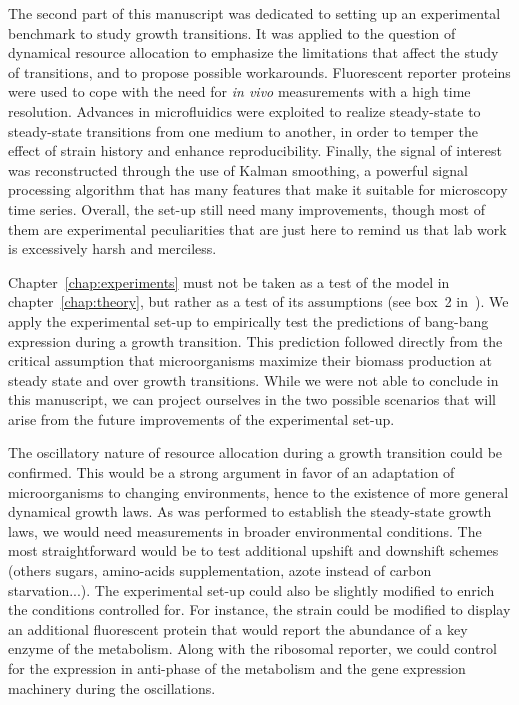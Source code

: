 The second part of this manuscript was dedicated to setting up an experimental benchmark to study growth transitions.
It was applied to the question of dynamical resource allocation to emphasize the limitations that affect the study of transitions, and to propose possible workarounds.
Fluorescent reporter proteins were used to cope with the need for \textit{in vivo} measurements with a high time resolution.
Advances in microfluidics were exploited to realize steady-state to steady-state transitions from one medium to another, in order to temper the effect of strain history and enhance reproducibility.
Finally, the signal of interest was reconstructed through the use of Kalman smoothing, a powerful signal processing algorithm that has many features that make it suitable for microscopy time series.
Overall, the set-up still need many improvements, though most of them are experimental peculiarities that are just here to remind us that lab work is excessively harsh and merciless.

Chapter~\ref{chap:experiments} must not be taken as a test of the model in chapter~\ref{chap:theory}, but rather as a test of its assumptions (see box~2 in~\cite{servedio_not_2014}).
We apply the experimental set-up to empirically test the predictions of bang-bang expression during a growth transition.
This prediction followed directly from the critical assumption that microorganisms maximize their biomass production at steady state and over growth transitions.
While we were not able to conclude in this manuscript, we can project ourselves in the two possible scenarios that will arise from the future improvements of the experimental set-up.

The oscillatory nature of resource allocation during a growth transition could be confirmed.
This would be a strong argument in favor of an adaptation of microorganisms to changing environments, hence to the existence of more general dynamical growth laws.
As was performed to establish the steady-state growth laws, we would need measurements in broader environmental conditions.
The most straightforward would be to test additional upshift and downshift schemes (others sugars, amino-acids supplementation, azote instead of carbon starvation...).
The experimental set-up could also be slightly modified to enrich the conditions controlled for.
For instance, the strain could be modified to display an additional fluorescent protein that would report the abundance of a key enzyme of the metabolism.
Along with the ribosomal reporter, we could control for the expression in anti-phase of the metabolism and the gene expression machinery during the oscillations.

